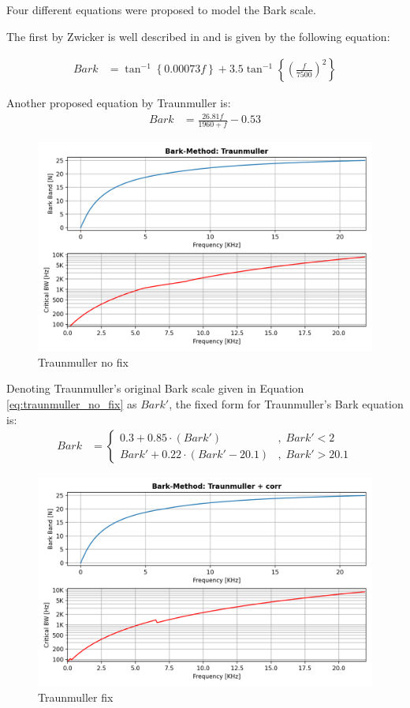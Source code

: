 Four different equations were proposed to model
the Bark scale.

The first by Zwicker is well described in\cite{1908630} and
is given by the following equation:

\begin{align}
    Bark & = \tan^{-1}\left\{ 0.00073f \right\} + 3.5 \tan^{-1}\left\{ 
            \left( \frac{f}{7500} \right)^{2}
        \right\}
\end{align}

Another proposed equation by Traunmuller \cite{TraunmullerScale} is:
\begin{align}\label{eq:traunmuller_no_fix}
    Bark & = \frac{26.81f}{1960 + f} - 0.53
\end{align}

\begin{figure}[H]
    \centering
    \includegraphics[width=0.75\linewidth]{Experiments/images/Traunmuller_nofix}
    \caption{Traunmuller no fix}\label{fig:Traunmuller_nofix}
\end{figure}

Denoting Traunmuller's original
Bark scale given in Equation \ref{eq:traunmuller_no_fix} as \(Bark'\),
the fixed form for Traunmuller's Bark equation is:
\begin{align}
    Bark & = \begin{cases}
        0.3 + 0.85\cdot \left( Bark' \right) 
        &,\;Bark' < 2 \\
        Bark' + 0.22\cdot \left( Bark' - 20.1 \right) 
        &,\;Bark' > 20.1
    \end{cases}
\end{align}

\begin{figure}[H]
    \centering
    \includegraphics[width=0.75\linewidth]{Experiments/images/Traunmuller_fix}
    \caption{Traunmuller fix}\label{fig:Traunmuller_fix}
\end{figure}

